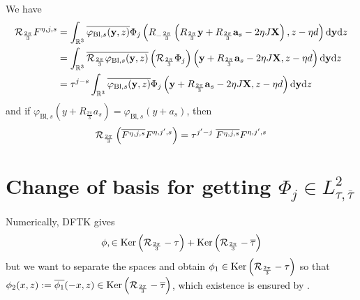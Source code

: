 \documentclass[11pt,a4paper,reqno,french,tikz]{amsart}
\def\d{{\rm d}}
\newcommand{\pa}[1]{\left( #1 \right)} %
\newcommand\vp{\varphi} %
\let\p\relax\newcommand{\p}{\psi} %
\newcommand{\f}[2]{\frac{#1}{#2}} %
\def\bX{{\mathbf X}}
\def\ba{{\mathbf a}}
\def\by{{\mathbf y}}
\begin{document}
We have
\begin{align*}
	\cR_{\f{2\pi}{3}} F^{\eta,j,s} &= \int_{\R^3} \overline{\vp_{\text{Bl},s}(\by,z)} \Phi_j \pa{R_{-\f{2\pi}3} \pa{R_{\f{2\pi}{3}}\by + R_{\f{2\pi}{3}} \ba_s -2\eta J \bX},z-\eta d} \d \by \d z \\
 &= \int_{\R^3} \overline{\cR_{\f{2\pi}{3}}\vp_{\text{Bl},s}(\by,z)} \pa{\cR_{\f{2\pi}{3}} \Phi_j} \pa{\by + R_{\f{2\pi}{3}} \ba_s -2\eta J \bX,z-\eta d} \d \by \d z \\
	&= \tau^{j-s} \int_{\R^3} \overline{ \vp_{\text{Bl},s}(\by,z)} \Phi_j \pa{\by + R_{\f{2\pi}{3}} \ba_s -2\eta J \bX,z-\eta d} \d \by \d z \\
\end{align*}
and if $\vp_{\text{Bl},s}(y + R_{\f{2\pi}{3}} a_s) = \vp_{\text{Bl},s}(y + a_s)$, then 
\begin{align*}
\cR_{\f{2\pi}{3}} \pa{ \overline{F^{\eta,j,s}} F^{\eta,j',s}} = \tau^{j'-j} \; \overline{F^{\eta,j,s}} F^{\eta,j',s}
\end{align*}



\section{Change of basis for getting $\Phi_j \in L^2_{\tau,\overline{\tau}}$}%
\label{sub:change_of_basis_for_getting_l_2__tau_tau}
Numerically, DFTK gives 
\begin{align*}
\phi, \p \in \Ker \pa{\cR_{\f{2\pi}{3}}-\tau} + \Ker\pa{\cR_{\f{2\pi}{3}}-\overline{\tau}}
\end{align*}
but we want to separate the spaces and obtain $\phi_1 \in \Ker \pa{\cR_{\f{2\pi}{3}}-\tau}$ so that $\phi_2(x,z) := \overline{\phi_1}(-x,z) \in \Ker\pa{\cR_{\f{2\pi}{3}}-\overline{\tau}}$, which existence is ensured by \cite{FefWei12}.
\end{document}
